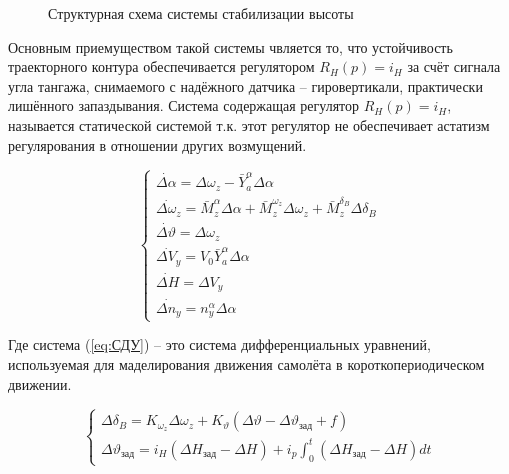 \documentclass[a4paper,12pt]{article}
\begin{document}
\begin{figure}[H]
    \caption{Структурная схема системы стабилизации высоты}
    \label{fig:2}
\end{figure}

Основным приемуществом такой системы чвляется то, что устойчивость траекторного контура обеспечивается 
регулятором $R_H(p)=i_H$ за счёт сигнала угла тангажа, снимаемого с надёжного датчика -- гировертикали, практически лишённого запаздывания.
Система содержащая регулятор $R_H(p)=i_H$, называется статической системой т.к. этот регулятор не обеспечивает астатизм регулярования в отношении других возмущений. 


\begin{equation}
    \begin{cases}
        \dot{\Delta\alpha}=\Delta\omega_z-\bar{Y}^\alpha_a\Delta\alpha\\
        \dot{\Delta\omega_z} = \bar{M}^\alpha_z\Delta\alpha+\bar{M}^{\omega_z}_z\Delta\omega_z+\bar{M}^{\delta_B}_z\Delta\delta_B\\
        \dot{\Delta\vartheta} = \Delta\omega_z\\
        \dot{\Delta V_y}=V_0\bar{Y}^\alpha_a\Delta\alpha\\
        \dot{\Delta H}=\Delta V_y\\
        \dot{\Delta n_y}=n^\alpha_y\Delta\alpha
    \end{cases}
    \label{eq:СДУ}
\end{equation}

Где система (\ref{eq:СДУ}) -- это система дифференциальных уравнений, используемая для маделирования
движения самолёта в короткопериодическом движении. 

\begin{equation}
    \begin{cases}
        \Delta\delta_B=K_{\omega_z}\Delta\omega_z+K_{\vartheta}(\Delta\vartheta-\Delta\vartheta_{зад}+f)\\
        \Delta\vartheta_{зад} = i_H(\Delta H_{зад}-\Delta H)+i_p\int_{0}^{t}(\Delta H_{зад}-\Delta H)dt
    \end{cases}
    \label{eq:заданные значения}
\end{equation}
 
\end{document}
